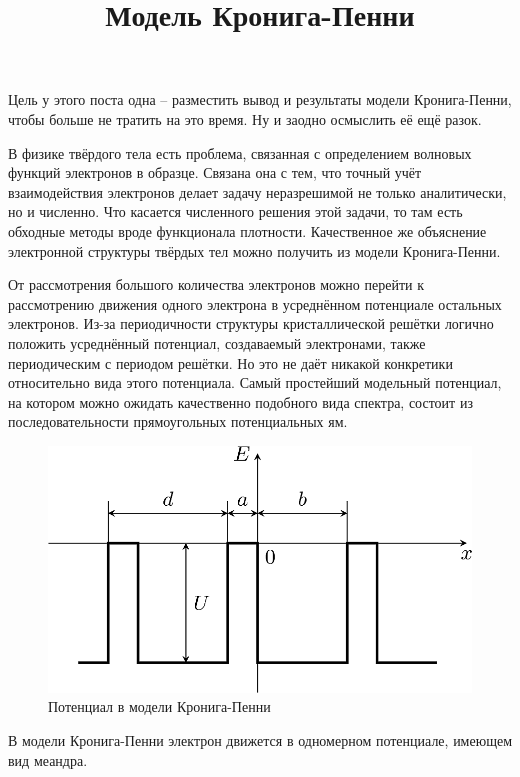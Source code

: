 

\title{Модель Кронига-Пенни}


\maketitle

Цель у этого поста одна -- разместить вывод и результаты модели Кронига-Пенни, чтобы больше не тратить на это время. Ну и заодно осмыслить её ещё разок.

В физике твёрдого тела есть проблема, связанная с определением волновых функций электронов в образце. Связана она с тем, что точный учёт взаимодействия электронов делает задачу неразрешимой не только аналитически, но и численно. Что касается численного решения этой задачи, то там есть обходные методы вроде функционала плотности. Качественное же объяснение электронной структуры твёрдых тел можно получить из модели Кронига-Пенни.

От рассмотрения большого количества электронов можно перейти к рассмотрению движения одного электрона в усреднённом потенциале остальных электронов. Из-за периодичности структуры кристаллической решётки логично положить усреднённый потенциал, создаваемый электронами, также периодическим с периодом решётки. Но это не даёт никакой конкретики относительно вида этого потенциала. Самый простейший модельный потенциал, на котором можно ожидать качественно подобного вида спектра, состоит из последовательности прямоугольных потенциальных ям.

\begin{figure}[h!]
    \center
    \includegraphics[width=.5\textwidth]{2015-11-09-kronig-penney-potential.png}
    \caption{Потенциал в модели Кронига-Пенни}
\end{figure}

В модели Кронига-Пенни электрон движется в одномерном потенциале, имеющем вид меандра.

